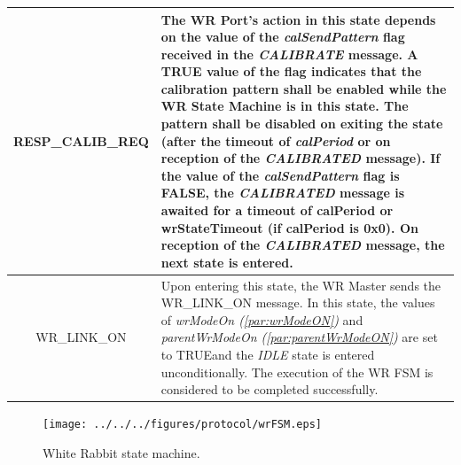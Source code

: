 \documentclass[a4paper, 12pt]{article}
\makeatletter
\renewcommand\paragraph{\@startsection{paragraph}{4}{\z@}%
                                     {-3.25ex\@plus -1ex \@minus -.2ex}%
                                     {0.0001pt \@plus .2ex}%
                                     {\normalfont\normalsize\bfseries}}
\makeatother
\begin{document}
\begin{table}[hp!]
\begin{tabular}{| c | p{12.2cm} |}
RESP\_CALIB\_REQ   &  The WR Port's action in this state depends on the value of the 
		      \textit{calSendPattern} flag received in the \textit{CALIBRATE} 
		      message. A TRUE value of the flag
		      indicates that the calibration pattern shall be enabled while the WR State 
		      Machine is in this state. The pattern shall  be
		      disabled on exiting the state (after the timeout of \textit{calPeriod} or 
		      on reception of the \textit{CALIBRATED} message). If the value of  the
		      \textit{calSendPattern} flag is FALSE, 
		      the \textit{CALIBRATED} message is awaited for a timeout of calPeriod or 
		      wrStateTimeout (if calPeriod is 0x0). On 
		      reception of the \textit{CALIBRATED} message, the next state is entered.\\
		      \hline
WR\_LINK\_ON       &  Upon entering this state, the WR Master sends the WR\_LINK\_ON message. 
		      In this state, the values of \textit{wrModeOn (\ref{par:wrModeON})} and 
		      \textit{parentWrModeOn (\ref{par:parentWrModeON})} are set to 
		      TRUE\footnotemark[6] and the \textit{IDLE}  state is entered unconditionally. 
		      The execution of the WR FSM is considered to be completed successfully. \\ \hline
\end{tabular}
\label{tab:wrFSMdesc}
\end{table}


\addtocounter{footnote}{1}

\begin{figure}[ht!]
  \centering
  \texttt{[image: ../../../figures/protocol/wrFSM.eps]}
  \caption{White Rabbit state machine.}
  \label{fig:wrFSM}
\end{figure}



\newpage


\end{document}
